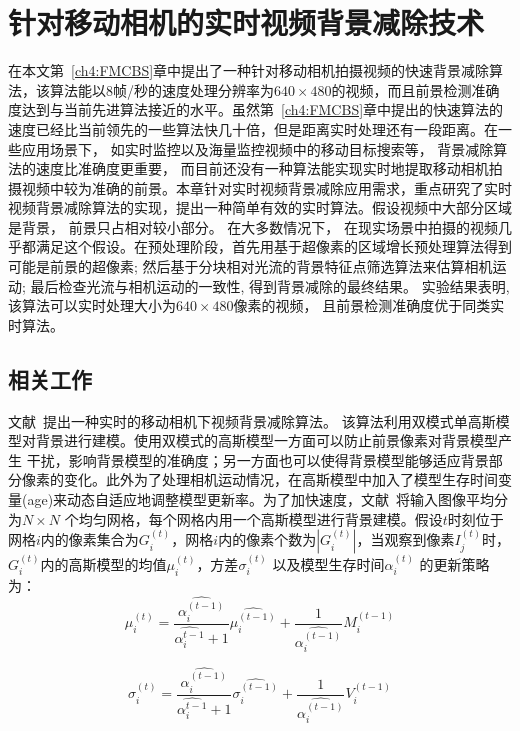 \chapter{针对移动相机的实时视频背景减除技术}
\label{ch5:RMCBS}

在本文第~\ref{ch4:FMCBS}章中提出了一种针对移动相机拍摄视频的快速背景减除算法，该算法能以8帧/秒的速度处理分辨率为$640 \times 480$的视频，而且前景检测准确度达到与当前先进算法接近的水平。虽然第~\ref{ch4:FMCBS}章中提出的快速算法的速度已经比当前领先的一些算法\cite{gbsuperpixel}快几十倍，但是距离实时处理还有一段距离。在一些应用场景下， 如实时监控以及海量监控视频中的移动目标搜索等， 背景减除算法的速度比准确度更重要， 而目前还没有一种算法能实现实时地提取移动相机拍摄视频中较为准确的前景。本章针对实时视频背景减除应用需求，重点研究了实时视频背景减除算法的实现，提出一种简单有效的实时算法。假设视频中大部分区域是背景， 前景只占相对较小部分。 在大多数情况下， 在现实场景中拍摄的视频几乎都满足这个假设。在预处理阶段，首先用基于超像素的区域增长预处理算法得到可能是前景的超像素; 然后基于分块相对光流的背景特征点筛选算法来估算相机运动; 最后检查光流与相机运动的一致性, 得到背景减除的最终结果。 实验结果表明, 该算法可以实时处理大小为$640 \times 480$像素的视频， 且前景检测准确度优于同类实时算法。



\section{相关工作}
\label{ch5:sec:relatedWorks}
 文献~提出一种实时的移动相机下视频背景减除算法。 该算法利用双模式单高斯模型对背景进行建模。使用双模式的高斯模型一方面可以防止前景像素对背景模型产生 干扰，影响背景模型的准确度；另一方面也可以使得背景模型能够适应背景部分像素的变化。此外为了处理相机运动情况，在高斯模型中加入了模型生存时间变量(age)来动态自适应地调整模型更新率。为了加快速度，文献~将输入图像平均分为$ N \times N $ 个均匀网格，每个网格内用一个高斯模型进行背景建模。假设$t$时刻位于网格$i$内的像素集合为$ G_{i}^{(t)}$，网格$i$内的像素个数为$ |G_{i}^{(t)}|$，当观察到像素$ I_j^{(t)}$时，$G_i^{(t)}$内的高斯模型的均值$ \mu_i^{(t)}$，方差$ \sigma_i^{(t)}$ 以及模型生存时间$\alpha_i^{(t)}$ 的更新策略为：
 $$\mu_i^{(t)} = \frac{\hat{\alpha_i^{(t-1)}}}{\hat{\alpha_i^{t-1}}+1}\hat{\mu_i^{(t-1)}} + \frac{1}{\hat{\alpha_i^{(t-1)}}}M_i^{(t-1)}$$

$$\sigma_i^{(t)} = \frac{\hat{\alpha_i^{(t-1)}}}{\hat{\alpha_i^{t-1}}+1}\hat{\sigma_i^{(t-1)}} + \frac{1}{\hat{\alpha_i^{(t-1)}}}V_i^{(t-1)}$$

